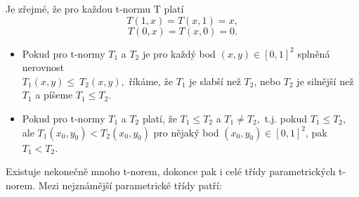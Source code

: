 \begin{remark}
    Je zřejmé, že pro každou t-normu T platí
    $$T(1,x)=T(x,1)=x,$$
    $$T(0,x)=T(x,0)=0.$$
\end{remark}
\newpage
\begin{definition}
\cite{KMP}
    \begin{itemize}
        \item Pokud pro t-normy $T_1$ a $T_2$ je
        pro každý bod $(x,y) \in [0,1]^2$ splněná nerovnost\\
        $T_1(x,y)\leq ~T_2(x,y),$ říkáme, že $T_1$ je slabší než $T_2$,
        nebo $T_2$ je silnější než $T_1$ a píšeme $T_1\leq T_2$.
        \item  Pokud pro t-normy $T_1$ a $T_2$ platí, že $T_1 \leq T_2$ a
        $T_1 \ne T_2,$ t.j. pokud $T_1 \leq T_2$, ale $T_1(x_0,y_0) <
        T_2(x_0,y_0)$ pro nějaký bod $(x_0,y_0) \in [0,1]^2$, pak $T_1<T_2$.
    \end{itemize}
\end{definition}
Existuje nekone\v cn\v e mnoho t-norem, dokonce pak i cel\'e t\v r\'idy parametrick\' ych  t-norem. Mezi nejzn\' am\v ej\v s\' i parametrické třídy patří:
